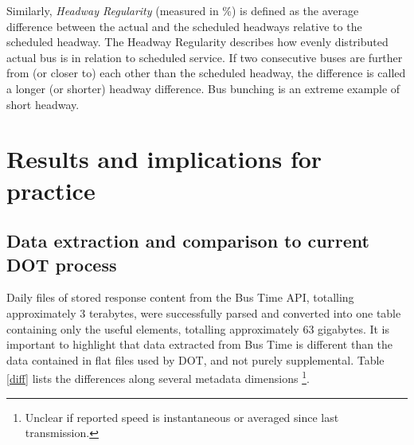 \documentclass[12pt]{report}
\begin{document}
Similarly, \textit{Headway Regularity} (measured in \%) is defined as the average difference between the actual and the scheduled headways relative to the scheduled headway. The Headway Regularity describes how evenly distributed actual bus is in relation to scheduled service. If two consecutive buses are further from (or closer to) each other than the scheduled headway, the difference is called a longer (or shorter) headway difference. Bus bunching is an extreme example of short headway.

\newpage

\section{Results and implications for practice}


\subsection{Data extraction and comparison to current DOT process} 

Daily files of stored response content from the Bus Time API, totalling approximately 3 terabytes, were successfully parsed and converted into one table containing only the useful elements, totalling approximately 63 gigabytes.  It is important to highlight that data extracted from Bus Time is different than the data contained in flat files used by DOT, and not purely supplemental. Table \ref{diff} lists the differences along several metadata dimensions \footnote{Unclear if reported speed is instantaneous or averaged since last transmission.}.

\vspace{0.5cm}

\end{document}
